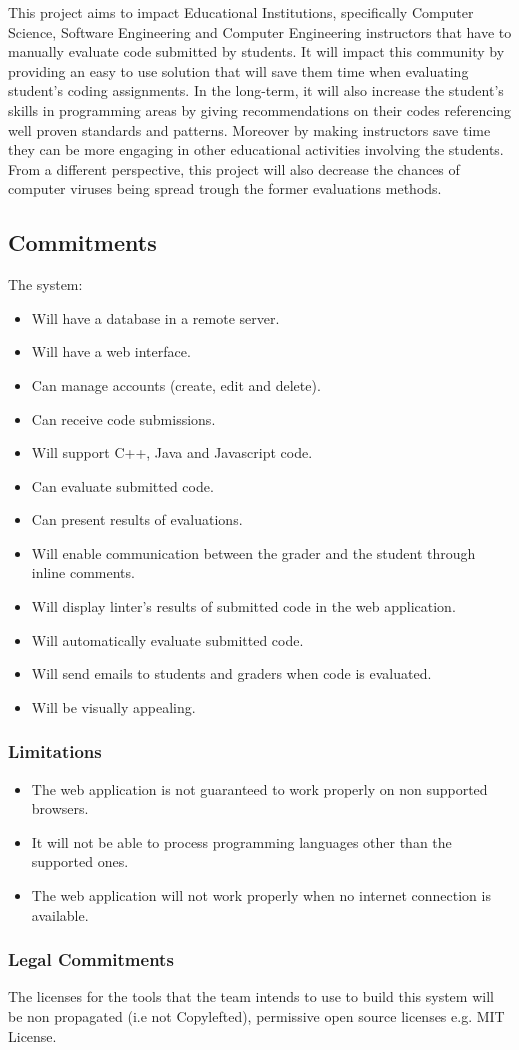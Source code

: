 
This project aims to impact Educational Institutions, specifically Computer Science, Software Engineering
and Computer Engineering instructors that have to manually evaluate code submitted
by students. It will impact this community by providing an easy to use solution
that will save them time when evaluating student's coding assignments. In the
long-term, it will also increase the student's skills in programming areas by
giving recommendations on their codes referencing well proven standards and
patterns. Moreover by making instructors save time they can be more engaging in
other educational activities involving the students. From a different
perspective, this project will also decrease the chances of computer viruses being spread
trough the former evaluations methods.

\subsection{Commitments}
The system:
\begin{itemize}
\item Will have a database in a remote server.
\item Will have a web interface.
\item Can manage accounts (create, edit and delete).
\item Can receive code submissions.
\item Will support C++, Java and Javascript code.
\item Can evaluate submitted code.
\item Can present results of evaluations.
\item Will enable communication between the grader and the student through
inline comments.
\item Will display linter's results of submitted code in the web application.
\item Will automatically evaluate submitted code.
\item Will send emails to students and graders when code is evaluated.
\item Will be visually appealing.
\end{itemize}

\subsubsection{Limitations}
\begin{itemize}
\item The web application is not guaranteed to work properly on non supported
browsers.
\item It will not be able to process programming languages other than the
supported ones.
\item The web application will not work properly when no internet connection is
available.
\end{itemize}

\subsubsection{Legal Commitments}

The licenses for the tools that the team intends to use to build this system will be non
propagated (i.e not Copylefted), permissive open source licenses e.g. MIT
License.